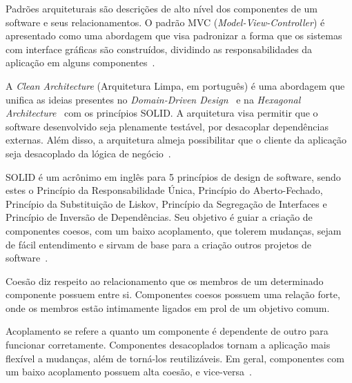 Padrões arquiteturais são descrições de alto nível dos componentes de um software e seus relacionamentos.
O padrão MVC (\emph{Model-View-Controller}) é apresentado como uma abordagem que visa padronizar a forma que os sistemas com interface gráficas são construídos, dividindo as responsabilidades da aplicação em alguns componentes~\cite{mvc-paper}.

A \emph{Clean Architecture} (Arquitetura Limpa, em português) é uma abordagem que unifica as ideias presentes no \emph{Domain-Driven Design}~\cite{ddd-book} e na \emph{Hexagonal Architecture}~\cite{hexagonal-arch} com os princípios SOLID\@.
A arquitetura visa permitir que o software desenvolvido seja plenamente testável, por desacoplar dependências externas.
Além disso, a arquitetura almeja possibilitar que o cliente da aplicação seja desacoplado da lógica de negócio~\cite{clean-arch-book}.

SOLID é um acrônimo em inglês para 5 princípios de design de software, sendo estes o Princípio da Responsabilidade Única, Princípio do Aberto-Fechado, Princípio da Substituição de Liskov, Princípio da Segregação de Interfaces e Princípio de Inversão de Dependências.
Seu objetivo é guiar a criação de componentes coesos, com um baixo acoplamento, que tolerem mudanças, sejam de fácil entendimento e sirvam de base para a criação outros projetos de software~\cite{clean-arch-book}.

Coesão diz respeito ao relacionamento que os membros de um determinado componente possuem entre si.
Componentes coesos possuem uma relação forte, onde os membros estão intimamente ligados em prol de um objetivo comum.

Acoplamento se refere a quanto um componente é dependente de outro para funcionar corretamente.
Componentes desacoplados tornam a aplicação mais flexível a mudanças, além de torná-los reutilizáveis.
Em geral, componentes com um baixo acoplamento possuem alta coesão, e vice-versa~\cite{coupling-and-cohesion}.